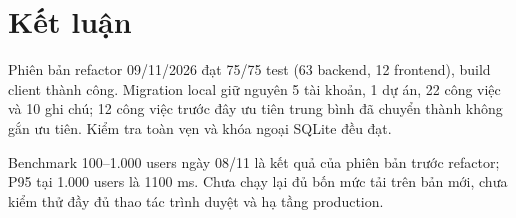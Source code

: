\section{Kết luận}

Phiên bản refactor 09/11/2026 đạt 75/75 test (63 backend, 12 frontend),
build client thành công. Migration local giữ nguyên 5 tài khoản, 1 dự án,
22 công việc và 10 ghi chú; 12 công việc trước đây ưu tiên trung bình đã chuyển thành không gắn ưu tiên.
Kiểm tra toàn vẹn và khóa ngoại SQLite đều đạt.

Benchmark 100--1.000 users ngày 08/11 là kết quả của phiên bản trước refactor;
P95 tại 1.000 users là 1100 ms. Chưa chạy lại đủ bốn mức tải trên bản mới,
chưa kiểm thử đầy đủ thao tác trình duyệt và hạ tầng production.
